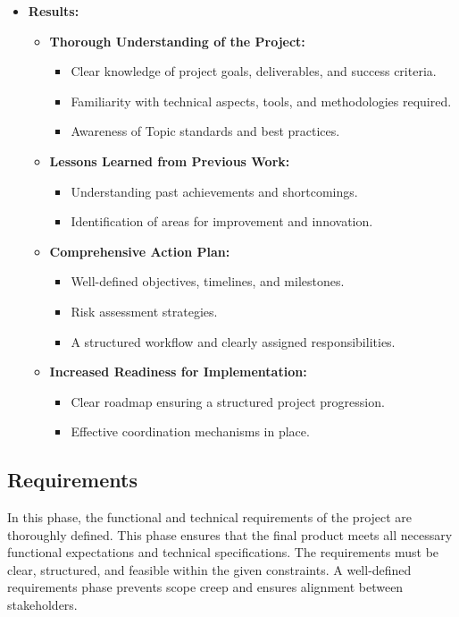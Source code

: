 \documentclass{article}
\begin{document}
\begin{itemize}[leftmargin=*, label={}]
    \item \textbf{Results:}
    \begin{itemize}
        \item \textbf{Thorough Understanding of the Project:}
        \begin{itemize}
            \item Clear knowledge of project goals, deliverables, and success criteria.
            \item Familiarity with technical aspects, tools, and methodologies required.
            \item Awareness of Topic standards and best practices.
        \end{itemize}
        \item \textbf{Lessons Learned from Previous Work:}
        \begin{itemize}
            \item Understanding past achievements and shortcomings.
            \item Identification of areas for improvement and innovation.
        \end{itemize}
        \item \textbf{Comprehensive Action Plan:}
        \begin{itemize}
            \item Well-defined objectives, timelines, and milestones.
            \item Risk assessment strategies.
            \item A structured workflow and clearly assigned responsibilities.
        \end{itemize}
        \item \textbf{Increased Readiness for Implementation:}
        \begin{itemize}
            \item Clear roadmap ensuring a structured project progression.
            \item Effective coordination mechanisms in place.
        \end{itemize}
    \end{itemize}
\end{itemize}


\subsection{Requirements}
In this phase, the functional and technical requirements of the project are thoroughly defined. This phase ensures that the final product meets all necessary functional expectations and technical specifications. The requirements must be clear, structured, and feasible within the given constraints. A well-defined requirements phase prevents scope creep and ensures alignment between stakeholders.
\end{document}
